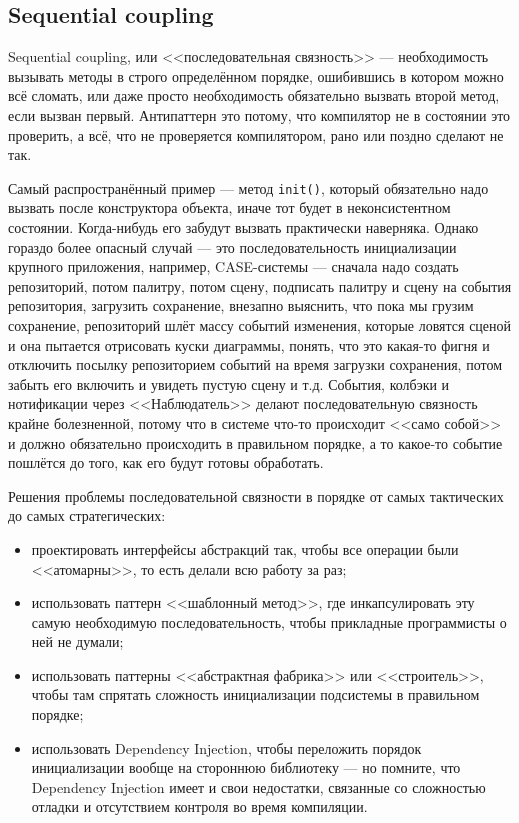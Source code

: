 \documentclass{../../text-style}
\begin{document}
\subsection{Sequential coupling}

Sequential coupling, или <<последовательная связность>> --- необходимость вызывать методы в строго определённом порядке, ошибившись в котором можно всё сломать, или даже просто необходимость обязательно вызвать второй метод, если вызван первый. Антипаттерн это потому, что компилятор не в состоянии это проверить, а всё, что не проверяется компилятором, рано или поздно сделают не так.

Самый распространённый пример --- метод \texttt{init()}, который обязательно надо вызвать после конструктора объекта, иначе тот будет в неконсистентном состоянии. Когда-нибудь его забудут вызвать практически наверняка. Однако гораздо более опасный случай --- это последовательность инициализации крупного приложения, например, CASE-системы --- сначала надо создать репозиторий, потом палитру, потом сцену, подписать палитру и сцену на события репозитория, загрузить сохранение, внезапно выяснить, что пока мы грузим сохранение, репозиторий шлёт массу событий изменения, которые ловятся сценой и она пытается отрисовать куски диаграммы, понять, что это какая-то фигня и отключить посылку репозиторием событий на время загрузки сохранения, потом забыть его включить и увидеть пустую сцену и т.д. События, колбэки и нотификации через <<Наблюдатель>> делают последовательную связность крайне болезненной, потому что в системе что-то происходит <<само собой>> и должно обязательно происходить в правильном порядке, а то какое-то событие пошлётся до того, как его будут готовы обработать.

Решения проблемы последовательной связности в порядке от самых тактических до самых стратегических:

\begin{itemize}
    \item проектировать интерфейсы абстракций так, чтобы все операции были <<атомарны>>, то есть делали всю работу за раз;
    \item использовать паттерн <<шаблонный метод>>, где инкапсулировать эту самую необходимую последовательность, чтобы прикладные программисты о ней не думали;
    \item использовать паттерны <<абстрактная фабрика>> или <<строитель>>, чтобы там спрятать сложность инициализации подсистемы в правильном порядке;
    \item использовать Dependency Injection, чтобы переложить порядок инициализации вообще на стороннюю библиотеку --- но помните, что Dependency Injection имеет и свои недостатки, связанные со сложностью отладки и отсутствием контроля во время компиляции.
\end{itemize}
\end{document}
